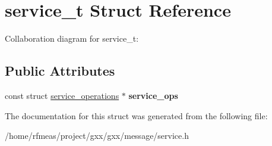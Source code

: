 \hypertarget{structservice__t}{}\section{service\+\_\+t Struct Reference}
\label{structservice__t}


Collaboration diagram for service\+\_\+t\+:
\subsection*{Public Attributes}
\begin{DoxyCompactItemize}
\item 
const struct \hyperlink{structservice__operations}{service\+\_\+operations} $\ast$ {\bfseries service\+\_\+ops}\hypertarget{structservice__t_a849af1be0e987d257e7f160755c8bae8}{}\label{structservice__t_a849af1be0e987d257e7f160755c8bae8}

\end{DoxyCompactItemize}


The documentation for this struct was generated from the following file\+:\begin{DoxyCompactItemize}
\item 
/home/rfmeas/project/gxx/gxx/message/service.\+h\end{DoxyCompactItemize}
